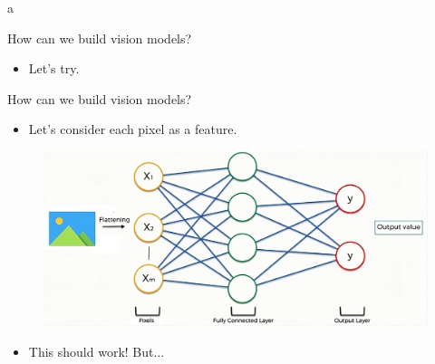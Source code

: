 a\documentclass[10pt]{beamer}
\theoremstyle{remark}
\theoremstyle{definition}
\begin{document}
\begin{frame}{How can we build vision models?}
\begin{itemize}
    \item Let's try.
\end{itemize}
\end{frame}

\begin{frame}{How can we build vision models?}
\begin{itemize}
    \item Let's consider each pixel as a feature.
\end{itemize}

\begin{figure}
\includegraphics[width=1.0\textwidth,height=1.0\textheight,keepaspectratio]{./images/images_nn.png}
\end{figure}
\begin{itemize}
    \item This should work! But...
\end{itemize}
\end{frame}
\end{document}

